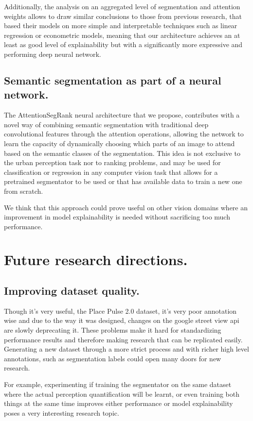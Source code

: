 Additionally, the analysis on an aggregated level of segmentation and attention weights
allows to draw similar conclusions to those from previous research, that based their models
on more simple and interpretable techniques such as linear regression or econometric models,
meaning that our architecture achieves an at least as good level of explainability
but with a significantly more expressive and performing deep neural network.

\subsection{Semantic segmentation as part of a neural network.}
The AttentionSegRank neural architecture that we propose, contributes with a novel way of combining
semantic segmentation with traditional deep convolutional features through the attention operations,
allowing the network to learn the capacity of dynamically choosing which parts of an image to attend
based on the semantic classes of the segmentation. This idea is not exclusive to the urban perception task
nor to ranking problems, and may be used for classification or regression in any computer vision task
that allows for a pretrained segmentator to be used or that has available data to train a new one from
scratch.

We think that this approach could prove useful on other vision domains where an improvement
in model explainability is needed without sacrificing too much performance.

\section{Future research directions.}

\subsection{Improving dataset quality.}
Though it's very useful, the Place Pulse 2.0 dataset, it's very poor annotation wise and due to
the way it was designed, changes on the google street view api are  slowly deprecating it. These
problems make it hard for standardizing performance results and therefore
making research that can be replicated easily. Generating a new dataset through a more strict process
and with richer high level annotations, such as segmentation labels could open many doors for new research.

For example, experimenting if training the segmentator on the same dataset where the actual perception quantification
will be learnt, or even training both things at the same time improves either performance
or model explainability poses a very interesting research topic.

